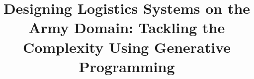 \documentclass[twocolumn]{bmcart}%
\begin{document}
\begin{frontmatter}

\begin{fmbox}


\title{Designing Logistics Systems on the Army Domain: Tackling the Complexity Using Generative Programming}



\author[
   addressref={aff1},                   %
   corref={aff1},                       %
   email={phtcosta@gmail.com}   %
]{ }
\author[
   addressref={aff1},
   corref={aff1},
   email={ednacanedo@unb.br}
]{ }
\author[
	addressref={aff1},
	corref={aff1},
	email={rbonifacio@unb.br}
]{ }


\address[id=aff1]{%
  , %
  ,                     %
  ,                        %
}



\end{fmbox}
\end{frontmatter}
\end{document}
